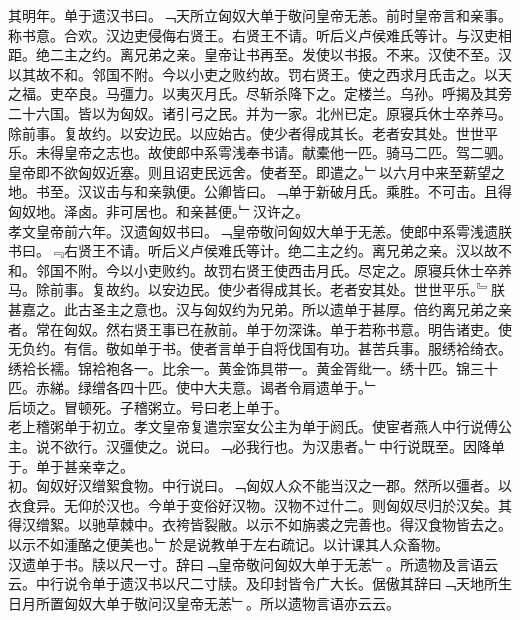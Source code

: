 \documentclass{zhvt-classic}
\begin{document}
\hspace*{2em}其明年。单于遗汉书曰。﹁天所立匈奴大单于敬问皇帝无恙。前时皇帝言和亲事。称书意。合欢。汉边吏侵侮右贤王。右贤王不请。听后义卢侯难氏等计。与汉吏相距。绝二主之约。离兄弟之亲。皇帝让书再至。发使以书报。不来。汉使不至。汉以其故不和。邻国不附。今以小吏之败约故。罚右贤王。使之西求月氏击之。以天之福。吏卒良。马彊力。以夷灭月氏。尽斩杀降下之。定楼兰。乌孙。呼揭及其旁二十六国。皆以为匈奴。诸引弓之民。并为一家。北州已定。原寝兵休士卒养马。除前事。复故约。以安边民。以应始古。使少者得成其长。老者安其处。世世平乐。未得皇帝之志也。故使郎中系雩浅奉书请。献橐他一匹。骑马二匹。驾二驷。皇帝即不欲匈奴近塞。则且诏吏民远舍。使者至。即遣之。﹂以六月中来至薪望之地。书至。汉议击与和亲孰便。公卿皆曰。﹁单于新破月氏。乘胜。不可击。且得匈奴地。泽卤。非可居也。和亲甚便。﹂汉许之。\\
\hspace*{2em}孝文皇帝前六年。汉遗匈奴书曰。﹁皇帝敬问匈奴大单于无恙。使郎中系雩浅遗朕书曰。﹃右贤王不请。听后义卢侯难氏等计。绝二主之约。离兄弟之亲。汉以故不和。邻国不附。今以小吏败约。故罚右贤王使西击月氏。尽定之。原寝兵休士卒养马。除前事。复故约。以安边民。使少者得成其长。老者安其处。世世平乐。﹄朕甚嘉之。此古圣主之意也。汉与匈奴约为兄弟。所以遗单于甚厚。倍约离兄弟之亲者。常在匈奴。然右贤王事已在赦前。单于勿深诛。单于若称书意。明告诸吏。使无负约。有信。敬如单于书。使者言单于自将伐国有功。甚苦兵事。服绣袷绮衣。绣袷长襦。锦袷袍各一。比余一。黄金饰具带一。黄金胥纰一。绣十匹。锦三十匹。赤綈。绿缯各四十匹。使中大夫意。谒者令肩遗单于。﹂\\
\hspace*{2em}后顷之。冒顿死。子稽粥立。号曰老上单于。\\
\hspace*{2em}老上稽粥单于初立。孝文皇帝复遣宗室女公主为单于阏氏。使宦者燕人中行说傅公主。说不欲行。汉彊使之。说曰。﹁必我行也。为汉患者。﹂中行说既至。因降单于。单于甚亲幸之。\\
\hspace*{2em}初。匈奴好汉缯絮食物。中行说曰。﹁匈奴人众不能当汉之一郡。然所以彊者。以衣食异。无仰於汉也。今单于变俗好汉物。汉物不过什二。则匈奴尽归於汉矣。其得汉缯絮。以驰草棘中。衣袴皆裂敝。以示不如旃裘之完善也。得汉食物皆去之。以示不如湩酪之便美也。﹂於是说教单于左右疏记。以计课其人众畜物。\\
\hspace*{2em}汉遗单于书。牍以尺一寸。辞曰﹁皇帝敬问匈奴大单于无恙﹂。所遗物及言语云云。中行说令单于遗汉书以尺二寸牍。及印封皆令广大长。倨傲其辞曰﹁天地所生日月所置匈奴大单于敬问汉皇帝无恙﹂。所以遗物言语亦云云。\\
\end{document}
